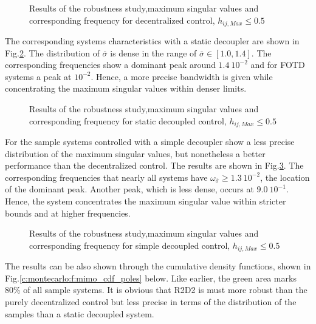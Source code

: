 \begin{figure}[H]\centering

\caption{Results of the robustness study,maximum singular values and corresponding frequency for decentralized control, $h_{ij,Max} \leq 0.5$}
\label{c:montecarlo:f:msv_rga_poles}
\end{figure}

The corresponding systems characteristics with a static decoupler are shown in Fig.\ref{c:montecarlo:f:msv_a_poles}. The distribution of $\overline{\sigma}$ is dense in the range of $\overline{\sigma} \in \left[ 1.0, 1.4\right]$. The corresponding frequencies show a dominant peak around $1.4~10^{-2}$ and for FOTD systems a peak at $10^{-2}$. Hence, a more precise bandwidth is given while concentrating the maximum singular values within denser limits.

\begin{figure}[H]\centering

\caption{Results of the robustness study,maximum singular values and corresponding frequency for static decoupled control, $h_{ij,Max} \leq 0.5$}
\label{c:montecarlo:f:msv_a_poles}
\end{figure}

For the sample systems controlled with a simple decoupler show a less precise distribution of the maximum singular values, but nonetheless a better performance than the decentralized control. The results are shown in Fig.\ref{c:montecarlo:f:msv_d_poles}. The corresponding frequencies that nearly all systems have  $\omega_{\overline{\sigma}} \geq 1.3~10^{-2}$, the location of the dominant peak. Another peak, which is less dense, occurs at $9.0~10^{-1}$. Hence, the system concentrates the maximum singular value within stricter bounds and at higher frequencies.

\begin{figure}[H]\centering

\caption{Results of the robustness study,maximum singular values and corresponding frequency for simple decoupled control, $h_{ij,Max} \leq 0.5$}
\label{c:montecarlo:f:msv_d_poles}
\end{figure}

The results can be also shown through the cumulative density functions, shown in Fig.\ref{c:montecarlo:f:mimo_cdf_poles} below. Like earlier, the green area marks 80\% of all sample systems. It is obvious that R2D2 is must more robust than the purely decentralized control but less precise in terms of the distribution of the samples than a static decoupled system. 

